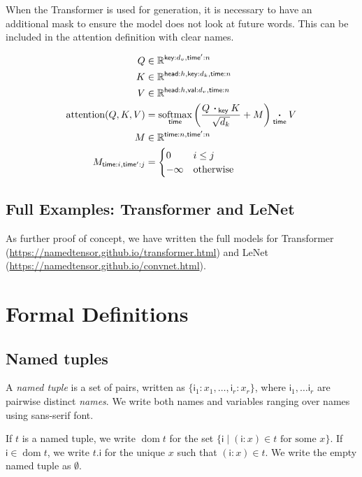 \documentclass{article}
\newcommand{\name}[1]{\mathsf{#1}}
\newcommand{\ndot}[1]{\mathbin{\mathop{\thinspace\boldsymbol\cdot\thinspace}\displaylimits_{\name{#1}}}}
\newcommand{\nfun}[2]{\mathop{\text{#2}}\displaylimits_{\name{#1}}}
\newcommand{\reals}{\mathbb{R}}
\newcommand{\tuple}[1]{\{ #1\}}
\DeclareMathOperator{\tupledom}{dom}
\newcommand{\tupleproj}[2]{#1.#2}
\begin{document}
When the Transformer is used for generation, it is necessary to have
an additional mask to ensure the model does not look at future words.
This can be included in the attention definition with clear names.

\begin{align*} 
Q &\in \reals^{\name{key}:d_v,\name{time'}:n}\\
K &\in \reals^{\name{head}:h,\name{key}:d_k, \name{time}:n}\\
V &\in \reals^{\name{head}:h, \name{val}:d_v, \name{time}:n}\\
\text{attention}(Q, K, V) &=  \nfun{time}{softmax} \left( \frac{Q \ndot{key} K }{\sqrt{d_k}} + M \right) \ndot{time} V \\
M & \in \reals^{\name{time}:n, \name{time'}:n} \\
M_{\name{time}:i, \name{time'}:j} & = \begin{cases}0 & i \leq j\\
-\infty & \text{otherwise} \end{cases} \\
\end{align*}


\subsection{Full Examples: Transformer and LeNet}

As further proof of concept, we have written the full models for Transformer (\url{https://namedtensor.github.io/transformer.html}) and LeNet (\url{https://namedtensor.github.io/convnet.html}). 

\section{Formal Definitions}
\label{sec:definitions}

\subsection{Named tuples}

A \emph{named tuple} is a set of pairs, written as $\tuple{\name{i}_1: x_1, \ldots, \name{i}_r: x_r}$, where $\name{i}_1, \ldots \name{i}_r$ are pairwise distinct \emph{names}. We write both names and variables ranging over names using sans-serif font.

If $t$ is a named tuple, we write $\tupledom{t}$ for the set $\{ \name{i} \mid \text{$(\name{i}:x) \in t$ for some $x$} \}$. If $\name{i} \in \tupledom{t}$, we write $\tupleproj{t}{\name{i}}$ for the unique $x$ such that $(\name{i}:x) \in t$. We write the empty named tuple as $\emptyset$.
\end{document}
